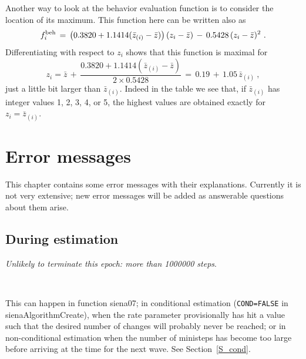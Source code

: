 \documentclass[a4paper,fleqn,11pt]{article}
\newcommand{\+}{\, + \,}
\newcommand{\sfn}[1]{\textsf{#1}}
\begin{document}
{Another way to look at the behavior evaluation function is to consider
the location of its maximum. This function here can be written also as
\[
   f^{\rm beh}_i \,=\, \big( 0.3820 +
                1.1414( \bar z_{(i)} - \bar z) \big) \, (z_i - \bar z)
       \,-\, 0.5428 \, (z_i - \bar z)^2   \ .
\]
Differentiating with respect to $z_i$ shows that
this function is maximal for
\[
   z_i = \bar z \,+\, \frac{0.3820 +
               1.1414( \bar z_{(i)} - \bar z)}{2 \times  0.5428 }
    \,=\,  0.19 \,+\, 1.05 \,  \bar z_{(i)}  \ ,
\]
just a little bit larger than $ \bar z_{(i)}$.
Indeed in the table we see that, if $ \bar z_{(i)}$
has integer values 1, 2, 3, 4, or 5,
the highest values are obtained exactly
for  $z_i = \bar z_{(i)}$.


\newpage
\section{Error messages}

This chapter contains some error messages with their explanations.
Currently it is not very  extensive; new error messages will be added
as answerable questions about them arise.

\subsection{During estimation}

\emph{Unlikely to terminate this epoch: more than 1000000 steps}.
\medskip

\begin{minipage}{0.05\textwidth}
$\phantom{abcde}$

\end{minipage}
\begin{minipage}{0.94\textwidth}
This can happen in function \sfn{siena07};
in conditional estimation (\texttt{COND=FALSE} in\\
 \sfn{sienaAlgorithmCreate}),
when the rate parameter provisionally has hit a value such that the
desired number of changes will probably never be reached;
or in non-conditional estimation when the number of ministeps has become
too large before arriving at the time for the next wave.
See Section~\ref{S_cond}.
\medskip


\end{minipage}}
\end{document}
